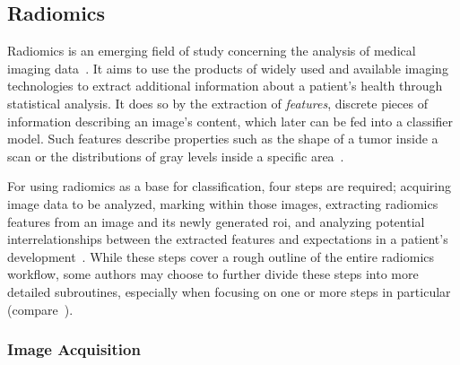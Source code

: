 

\subsection{Radiomics}\label{sec:intro_radiomics}


Radiomics is an emerging field of study concerning the analysis of medical 
imaging data~\cite{applications_and_limitations_of_radiomics}. It aims to use
the products of widely used and available imaging technologies to extract 
additional information about a patient's health through statistical analysis.
It does so by the extraction of \textit{features}, discrete pieces of 
information describing an image's content, which later can be fed into a 
classifier model. Such features describe properties such as the shape of a tumor
inside a scan or the distributions of gray levels inside a specific area~\cite{radiomics_the_bridge,pcr_lymph,radiomics_process_and_challenges}.

For using radiomics as a base for classification, four steps are required; 
acquiring image data to be analyzed, marking  within those images, extracting 
radiomics features from an image and its newly generated \ac{roi}, and analyzing potential
interrelationships between the extracted features and expectations in a 
patient's development~\cite{radiomics_advanced_feature_analysis,radiomics_process_and_challenges}.
While these steps cover a rough outline of the entire radiomics workflow, some
authors may choose to further divide these steps into more detailed subroutines,
especially when focusing on one or more steps in particular 
(compare~\cite{ibsi_paper}).

\subsubsection{Image Acquisition}\label{sec:radiomics_image_acquisition}


